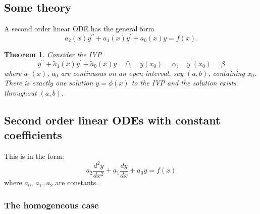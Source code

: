 \documentclass{article}
\newtheorem{theorem}{Theorem}
\begin{document}
\subsection{Some theory}
A second order linear ODE has the general form
\begin{equation}
    a_2(x)y^{\prime\prime} + a_1(x)y^\prime + a_0(x)y = f(x).
\end{equation}
\begin{theorem}
    Consider the IVP
    \begin{equation}
        y^{\prime\prime} + \tilde{a}_1(x)y^\prime + \tilde{a}_0(x)y = 0,\quad y(x_0)=\alpha,\quad y^\prime(x_0)=\beta
    \end{equation}
    where $\tilde{a}_1(x)$, $\tilde{a}_0$ are continuous on an open interval, say $(a,b)$, containing $x_0$. There is exactly one solution $y=\phi(x)$ to the IVP and the solution exists throughout $(a,b)$.
\end{theorem}

\subsection{Second order linear ODEs with constant coefficients}
This is in the form:
\begin{equation}
    a_2\frac{d^2 y}{dx^2} + a_1\frac{dy}{dx} + a_0 y = f(x)
\end{equation}
where $a_0,\,a_1,\,a_2$ are constants.

\subsubsection{The homogeneous case}
\end{document}
